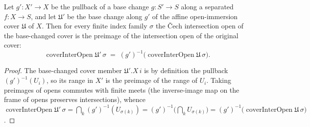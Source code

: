 \begin{lemma}\leanok
  \label{lem:coverinteropen_basechange_eq}
  Let \(g' : X' \to X\) be the pullback of a base change \(g : S' \to S\) along a separated
  \(f : X \to S\), and let \(\mathfrak{U}'\) be the base change along \(g'\) of the affine
  open-immersion cover \(\mathfrak{U}\) of \(X\). Then for every finite index family
  \(\sigma\) the {\v C}ech intersection open of the base-changed cover is the preimage of the
  intersection open of the original cover:
  \[
    \operatorname{coverInterOpen}\mathfrak{U}'\,\sigma
      \;=\; (g')^{-1}\bigl(\operatorname{coverInterOpen}\mathfrak{U}\,\sigma\bigr).
  \]
\end{lemma}
\begin{proof}
  The base-changed cover member \(\mathfrak{U}'.X\,i\) is by definition the pullback
  \((g')^{-1}(U_i)\), so its range in \(X'\) is the preimage of the range of \(U_i\). Taking
  preimages of opens commutes with finite meets (the inverse-image map on the frame of opens
  preserves intersections), whence
  \(\operatorname{coverInterOpen}\mathfrak{U}'\,\sigma = \bigcap_k (g')^{-1}(U_{\sigma(k)})
  = (g')^{-1}\bigl(\bigcap_k U_{\sigma(k)}\bigr)
  = (g')^{-1}\bigl(\operatorname{coverInterOpen}\mathfrak{U}\,\sigma\bigr)\).
\end{proof}

